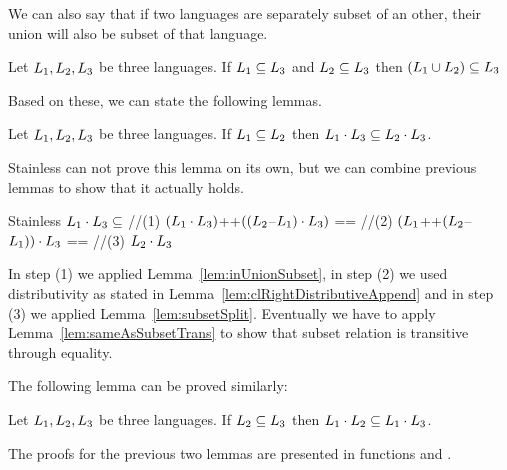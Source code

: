We can also say that if two languages are separately subset of an other, their union will also be subset of that language.

\begin{lemma}
	\label{lem:unionSubset}
	Let $L_{1}, L_{2}, L_{3}$ be three languages. If $L_{1} \subseteq L_{3}$ and $L_{2} \subseteq L_{3}$ then $(L_{1} \cup L_{2})\subseteq L_{3}$
\end{lemma}

Based on these, we can state the following lemmas.

\begin{lemma}
	\label{lem:concatSubset}
	Let $L_{1}, L_{2}, L_{3}$ be three languages. If $L_{1} \subseteq L_{2}$ then $L_{1} \cdot L_{3} \subseteq L_{2} \cdot L_{3}$.
\end{lemma}

Stainless can not prove this lemma on its own, but we can combine previous lemmas to show that it actually holds.

\begin{ShortCode}{Stainless}
 $L_{1} \cdot L_{3} \subseteq $ //(1)
 $(L_{1}  \cdot L_{3}) $++$ ((L_{2} $--$ L_{1}) \cdot L_{3}) $ == //(2)
 $(L_{1} $++$ (L_{2} $--$ L_{1})) \cdot L_{3} $        == //(3)
 $L_{2} \cdot L_{3}$
\end{ShortCode}

In step (1) we applied Lemma~\ref{lem:inUnionSubset}, in step (2) we used distributivity as stated in Lemma~\ref{lem:clRightDistributiveAppend} and in step (3) we applied Lemma~\ref{lem:subsetSplit}. Eventually we have to apply Lemma~\ref{lem:sameAsSubsetTrans} to show that subset relation is transitive through equality.

The following lemma can be proved similarly:
\begin{lemma}
	\label{lem:concatSubset2}
	Let $L_{1}, L_{2}, L_{3}$ be three languages. If $L_{2} \subseteq L_{3}$ then $L_{1} \cdot L_{2} \subseteq L_{1} \cdot L_{3}$.
\end{lemma}

The proofs for the previous two lemmas are presented in functions  and .

